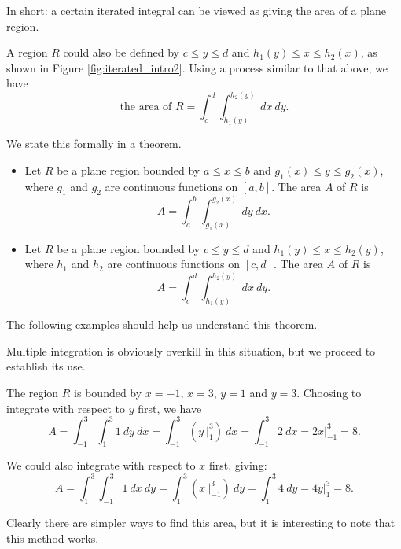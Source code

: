 In short: a certain iterated integral can be viewed as giving the area of a plane region.

A region $R$ could also be defined by $c\leq y\leq d$ and $h_1(y)\leq x\leq h_2(x)$, as shown in Figure \ref{fig:iterated_intro2}. Using a process similar to that above, we have 
$$\text{the area of }R = \int_c^d\int_{h_1(y)}^{h_2(y)} \ dx\ dy.$$


We state this formally in a theorem.

{\begin{itemize}
	\item Let $R$ be a plane region bounded by $a\leq x\leq b$ and $g_1(x)\leq y\leq g_2(x)$, where $g_1$ and $g_2$ are continuous functions on $[a,b]$. The area $A$ of $R$ is
	$$A = \int_a^b\int_{g_1(x)}^{g_2(x)} \ dy\ dx.$$
	\item Let $R$ be a plane region bounded by $c\leq y\leq d$ and $h_1(y)\leq x\leq h_2(y)$, where $h_1$ and $h_2$ are continuous functions on $[c,d]$. The area $A$ of $R$ is
	$$A = \int_c^d\int_{h_1(y)}^{h_2(y)} \ dx\ dy.$$
\end{itemize}
}

The following examples should help us understand this theorem.\\

{Multiple integration is obviously overkill in this situation, but we proceed to establish its use.

The region $R$ is bounded by $x=-1$, $x=3$, $y=1$ and $y=3$. Choosing to integrate with respect to $y$ first, we have 
$$A = \int_{-1}^3\int_1^3 1\ dy\ dx = \int_{-1}^3 \left(y\ \Big|_1^3\right)\ dx = \int_{-1}^3 2\ dx = 2x\Big|_{-1}^3=8.$$

We could also integrate with respect to $x$ first, giving:
$$A = \int_1^3\int_{-1}^3 1\ dx \ dy =\int_1^3 \left(x\ \Big|_{-1}^3\right)\ dy = \int_1^3 4\ dy = 4y\Big|_1^3 = 8.$$

Clearly there are simpler ways to find this area, but it is interesting to note that this method works.
}\\

